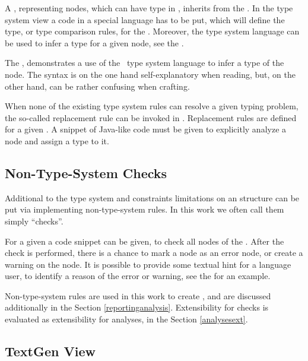 
A , representing nodes, which can have type in \mbdr, inherits from the  . 
In the type system view a code in a special language has to be put, which will define the type, or type comparison rules, for the .
Moreover, the type system language can be used to infer a type for a given node,  see the .

The , demonstrates a use of the \jbmps\ type system language to infer a type of the  
node. The syntax is on the one hand self-explanatory when reading, but, on the other hand, can be rather confusing when crafting.

When none of the existing type system rules can resolve a given typing problem, the so-called replacement
rule can be invoked in \jbmps. Replacement rules are defined for a given . A snippet of Java-like
code must be given to explicitly analyze a node and assign a type to it.


\subsection{Non-Type-System Checks}
\label{mpsnontschecks}

Additional to the type system and constraints limitations on an  structure can be put via implementing 
non-type-system rules. In this work we often call them simply ``checks''.

For a given  a code snippet can be given, to check all nodes of the . After the 
check is performed, there is a chance to mark a node as an error node, or create a warning on the node.
It is possible to provide some textual hint for a language user, to identify a reason of the error or warning, 
see the  for an example.

Non-type-system rules are used in this work to create , and are discussed additionally in the Section 
\ref{reportinganalysis}. Extensibility for checks is evaluated as extensibility for analyses, in the Section \ref{analysesext}.

\subsection{TextGen View}

